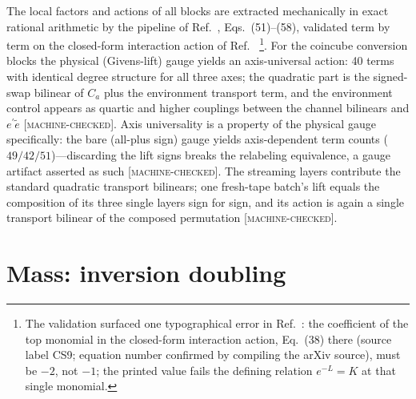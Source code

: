 \documentclass[aps,prd,twocolumn,superscriptaddress,nofootinbib,floatfix]{revtex4-2}
\newcommand{\evM}{\textnormal{\textsc{[machine-checked]}}}
\begin{document}
The local factors and actions of all blocks are extracted mechanically in
exact rational arithmetic by the pipeline of
Ref.~\cite{Wetterich2022}, Eqs.~(51)--(58), validated term by term on the
closed-form interaction action of Ref.~\cite{Wetterich2022b}%
\footnote{The validation surfaced one typographical error in
Ref.~\cite{Wetterich2022b}: the coefficient of the top monomial in the
closed-form interaction action, Eq.~(38) there (source label CS9;
equation number confirmed by compiling the arXiv source), must be $-2$,
not $-1$; the printed value fails the defining relation $e^{-L}=K$ at
that single monomial.}. For the coincube conversion blocks the physical (Givens-lift)
gauge yields an axis-universal action: 40 terms with identical degree
structure for all three axes; the quadratic part is the signed-swap
bilinear of $C_a$ plus the environment transport term, and the
environment control appears as quartic and higher couplings between the
channel bilinears and $e^\prime\tilde e$ \evM{}. Axis universality is a
property of the physical gauge specifically: the bare (all-plus sign)
gauge yields axis-dependent term counts ($49/42/51$)---discarding the
lift signs breaks the relabeling equivalence, a gauge artifact asserted
as such \evM{}. The streaming layers contribute the standard quadratic
transport bilinears; one fresh-tape batch's lift equals the composition
of its three single layers sign for sign, and its action is again a
single transport bilinear of the composed permutation \evM{}.

\section{Mass: inversion doubling}
\label{sec:mass}
\end{document}
